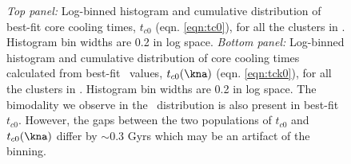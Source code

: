 \begin{figure}[htp]
\begin{center}
    \caption{{\it{Top panel:}} Log-binned histogram and cumulative
    distribution of best-fit core cooling times, $t_{c0}$
    (eqn. \ref{eqn:tc0}), for all the clusters in \accept. Histogram
    bin widths are 0.2 in log space. {\it{Bottom panel:}} Log-binned
    histogram and cumulative distribution of core cooling times
    calculated from best-fit \kna\ values, $t_{c0}(\kna)$
    (eqn. \ref{eqn:tck0}), for all the clusters in \accept. Histogram
    bin widths are 0.2 in log space. The bimodality we observe in the
    \kna\ distribution is also present in best-fit $t_{c0}$. However,
    the gaps between the two populations of $t_{c0}$ and
    $t_{c0}(\kna)$ differ by $\sim 0.3$ Gyrs which may be an artifact of the binning.}
    \label{fig:t0}
  \end{center}
\end{figure}

